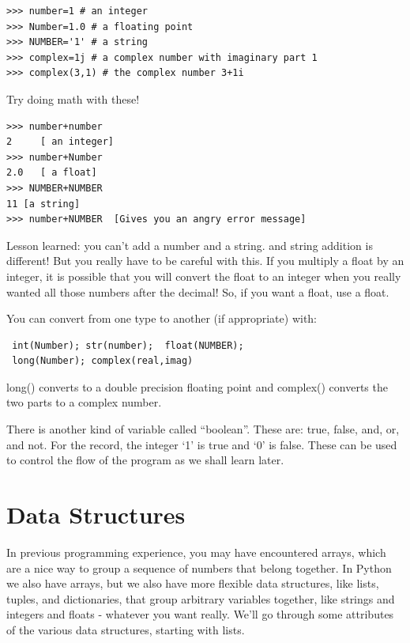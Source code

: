 \documentclass[11pt]{book}
\begin{document}
{{ \color{blue} \begin{verbatim}
>>> number=1 # an integer
>>> Number=1.0 # a floating point
>>> NUMBER='1' # a string
>>> complex=1j # a complex number with imaginary part 1
>>> complex(3,1) # the complex number 3+1i
\end{verbatim}}
\noindent
{Try doing math with these!}
{ \color{blue} \begin{verbatim}
>>> number+number
2     [ an integer]
>>> number+Number
2.0   [ a float]
>>> NUMBER+NUMBER
11 [a string]
>>> number+NUMBER  [Gives you an angry error message]
\end{verbatim}}
\noindent
 Lesson learned: you can't add a number and a string.  and string addition is different!  But you really have to be careful with this.  If you multiply a float by an integer, it is possible that you will convert the float to an integer when you really wanted all those numbers after the decimal! So, if you want a float, use a float.

{ You can convert from one type to another (if appropriate) with:}
{ \color{blue} \begin{verbatim}
 int(Number); str(number);  float(NUMBER);
 long(Number); complex(real,imag)
 \end{verbatim}}

\noindent
{\color{blue}long()} converts to a double precision floating point and {\color{blue}complex()} converts the two parts to a complex number.

 There is another kind of variable called ``boolean''. These are: {\color{blue}true}, {\color{blue}false}, {\color{blue}and}, {\color{blue}or}, and {\color{blue}not}.
For the record, the integer  `1' is {\color{blue}true} and  `0' is {\color{blue}false}.
These can be used to control the flow of the program as we shall learn later.

\section{Data Structures}

In previous programming experience, you may have encountered arrays, which are a nice way to group a sequence of numbers that belong together.  In Python  we also have arrays, but we also have more flexible data structures, like lists, tuples, and dictionaries,  that group arbitrary variables together, like strings and integers and floats - whatever you want really. We'll go through some attributes of the various data structures, starting with lists.

}
\end{document}
